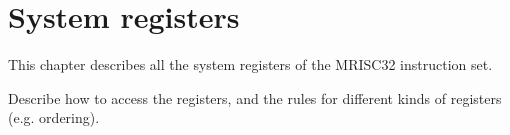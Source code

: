 %

\chapter{System registers}

This chapter describes all the system registers of the MRISC32 instruction set.

\begin{todobox}
    Describe how to access the registers, and the rules for different kinds of
    registers (e.g. ordering).
\end{todobox}

\clearpage


